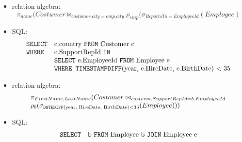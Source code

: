 \begin{exercise}{16}
\begin{subexercise}
\begin{itemize}
      \item relation algebra:
        \begin{displaymath}
          \pi_{name}(Costumer \bowtie_{costomer.city =
          emp.city}\rho_{emp}(\sigma_{ReportsTo = EmployeeId}(Employee)
        \end{displaymath}
    \end{itemize}
  \end{subexercise}
  \begin{subexercise}
    \begin{itemize}
      \item SQL:
            \begin{displaymath}
              \begin{array}{l l}
                \text{\texttt{SELECT}}& \text{c.country \texttt{FROM} Customer c}\\
                \text{\texttt{WHERE}}& \text{c.SupportRepId \texttt{IN}}\\
                                    & \text{\texttt{SELECT} e.EmployeeId
                                    \texttt{FROM} Employee e}\\
                                    & \text{\texttt{WHERE TIMESTAMPDIFF}(year,
                                    e.HireDate, e.BirthDate) < 35}
              \end{array}
            \end{displaymath}
      \item relation algebra:
        \begin{displaymath}
          \begin{array}{l}
            \pi_{FirstName, LastName}(Costomer \bowtie_{costerm.SupportRepId =
            b.EmployeeId} \\
            \rho_{b}(\sigma_{\text{\texttt{DATEDIFF}(year, HireDate,
            BirthDate)} < 35}(Employee)))
          \end{array}
        \end{displaymath}
    \end{itemize}
  \end{subexercise}
  \begin{subexercise}
    \begin{itemize}
      \item SQL:
            \begin{displaymath}
              \begin{array}{l l}
                \text{\texttt{SELECT}}& \text{b \texttt{FROM} Employee b
                                        \texttt{JOIN} Employee e}\\

\end{array}
\end{displaymath}
\end{itemize}
\end{subexercise}
\end{exercise}
